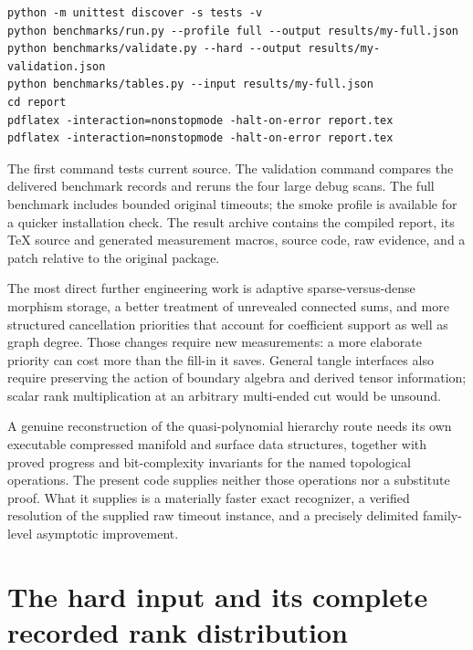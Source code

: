 \documentclass[11pt]{article}
\newcommand{\code}[1]{\texttt{\detokenize{#1}}}
\begin{document}
\begin{lstlisting}
python -m unittest discover -s tests -v
python benchmarks/run.py --profile full --output results/my-full.json
python benchmarks/validate.py --hard --output results/my-validation.json
python benchmarks/tables.py --input results/my-full.json
cd report
pdflatex -interaction=nonstopmode -halt-on-error report.tex
pdflatex -interaction=nonstopmode -halt-on-error report.tex
\end{lstlisting}
The first command tests current source. The validation command compares the
delivered benchmark records and reruns the four large debug scans.
The full benchmark includes bounded original timeouts; the smoke profile is
available for a quicker installation check. The result archive contains the
compiled report, its TeX source and generated measurement macros, source code,
raw evidence, and a patch relative to the original \code{fast/} package.

The most direct further engineering work is adaptive sparse-versus-dense
morphism storage, a better treatment of unrevealed connected sums, and more
structured cancellation priorities that account for coefficient support as
well as graph degree. Those changes require new measurements: a more elaborate
priority can cost more than the fill-in it saves. General tangle interfaces
also require preserving the action of boundary algebra and derived tensor
information; scalar rank multiplication at an arbitrary multi-ended cut would
be unsound.

A genuine reconstruction of the quasi-polynomial hierarchy route needs its
own executable compressed manifold and surface data structures, together with
proved progress and bit-complexity invariants for the named topological
operations. The present code supplies neither those operations nor a substitute
proof. What it supplies is a materially faster exact recognizer, a verified
resolution of the supplied raw timeout instance, and a precisely delimited
family-level asymptotic improvement.

\appendix
\section{The hard input and its complete recorded rank distribution}
\end{document}
